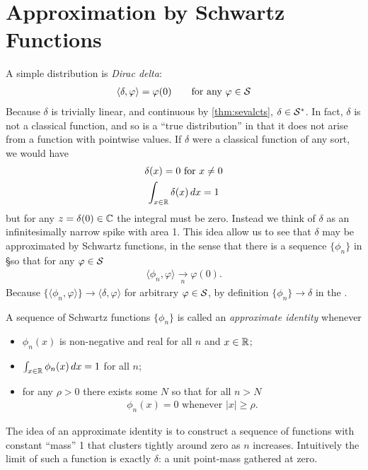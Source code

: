   \section{Approximation by Schwartz Functions}
    A simple distribution is \emph{Dirac delta}:
    \begin{gather*}
      \langle\delta,\varphi\rangle = \varphi(0)
      \qquad\text{for any }\varphi\in\S
    \end{gather*}
    Because $\delta$ is trivially linear, and continuous by \cref{thm:sevalcts}, $\delta\in\SS$.
    In fact, $\delta$ is not a classical function, and so is a ``true distribution'' in that it does not arise from a function with pointwise values.
    If $\delta$ were a classical function of any sort, we would have
    \begin{gather*}
      \delta(x)=0\text{ for }x\ne0\\
      \int_{x\in\R} \delta(x)\,dx = 1
    \end{gather*}
    but for any $z=\delta(0)\in\C$ the integral must be zero.
    Instead we think of $\delta$ as an infinitesimally narrow spike with area 1.
    This idea allow us to see that $\delta$ may be approximated by Schwartz functions, in the sense that there is a sequence $\{\phi_n\}$ in \S so that for any $\varphi\in\S$
    \begin{align*}
      \langle \phi_n, \varphi\rangle \underset{n}{\longrightarrow} \varphi(0)\text{.}
    \end{align*}
    Because $\{\langle\phi_n,\varphi\rangle\}\rightarrow\langle\delta,\varphi\rangle$ for arbitrary $\varphi\in\S$, by definition $\{\phi_n\}\rightarrow\delta$ in the \ws.

    \begin{defn}
      A sequence of Schwartz functions $\{\phi_n\}$ is called an \emph{approximate identity} whenever
      \begin{itemize}
        \item $\phi_n(x)$ is non-negative and real for all $n$ and $x\in\R$;
        \item $\int_{x\in\R}\phi_n(x)\,dx=1$ for all $n$;
        \item for any $\rho>0$ there exists some $N$ so that for all $n>N$ 
          \begin{align*}
            \phi_n(x) = 0 \text{ whenever } |x|\ge\rho \text{.}
          \end{align*}
      \end{itemize}
    \end{defn}
    The idea of an approximate identity is to construct a sequence of functions with constant ``mass'' 1 that clusters tightly around zero as $n$ increases.
    Intuitively the limit of such a function is exactly $\delta$: a unit point-mass gathered at zero.

